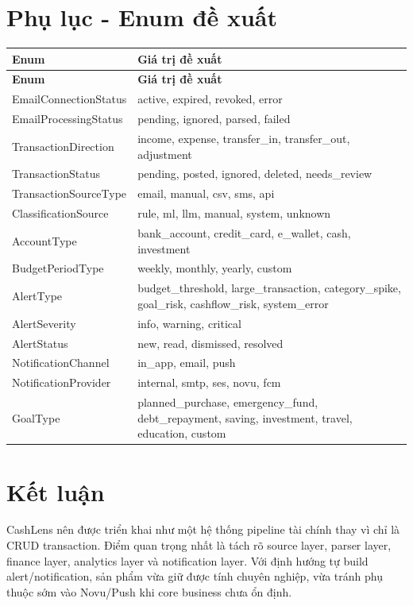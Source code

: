 \documentclass[11pt,a4paper]{article}
\renewcommand{\thead}[1]{\textbf{\color{PrimaryDark}#1}}
\newenvironment{tableblock}{\Needspace{8\baselineskip}\vspace{0.25em}}{\vspace{0.75em}}
\begin{document}
\section{Phụ lục - Enum đề xuất}
\begin{tableblock}
\scriptsize
\begin{longtable}{L{4.5cm}L{10.5cm}}
\thead{Enum} & \thead{Giá trị đề xuất} \\
\endfirsthead
{}\thead{Enum} & \thead{Giá trị đề xuất} \\
\endhead
EmailConnectionStatus & active, expired, revoked, error \\
EmailProcessingStatus & pending, ignored, parsed, failed \\
TransactionDirection & income, expense, transfer\_in, transfer\_out, adjustment \\
TransactionStatus & pending, posted, ignored, deleted, needs\_review \\
TransactionSourceType & email, manual, csv, sms, api \\
ClassificationSource & rule, ml, llm, manual, system, unknown \\
AccountType & bank\_account, credit\_card, e\_wallet, cash, investment \\
BudgetPeriodType & weekly, monthly, yearly, custom \\
AlertType & budget\_threshold, large\_transaction, category\_spike, goal\_risk, cashflow\_risk, system\_error \\
AlertSeverity & info, warning, critical \\
AlertStatus & new, read, dismissed, resolved \\
NotificationChannel & in\_app, email, push \\
NotificationProvider & internal, smtp, ses, novu, fcm \\
GoalType & planned\_purchase, emergency\_fund, debt\_repayment, saving, investment, travel, education, custom \\
\end{longtable}
\end{tableblock}

\section{Kết luận}
CashLens nên được triển khai như một hệ thống pipeline tài chính thay vì chỉ là CRUD transaction. Điểm quan trọng nhất là tách rõ source layer, parser layer, finance layer, analytics layer và notification layer. Với định hướng tự build alert/notification, sản phẩm vừa giữ được tính chuyên nghiệp, vừa tránh phụ thuộc sớm vào Novu/Push khi core business chưa ổn định.
\end{document}
